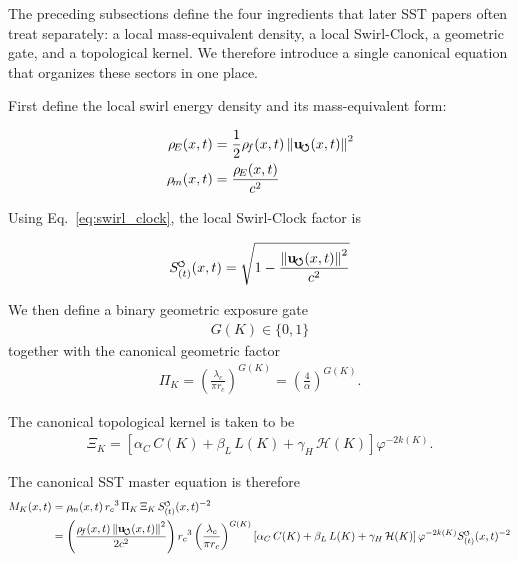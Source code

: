 \documentclass[11pt]{article}
\theoremstyle{definition}
\theoremstyle{plain}
\theoremstyle{remark}
\newcommand{\swirlarrow}{\mathchoice{\mkern-2mu\scriptstyle\boldsymbol{\circlearrowleft}}{\mkern-2mu\scriptstyle\boldsymbol{\circlearrowleft}}{\mkern-2mu\scriptscriptstyle\boldsymbol{\circlearrowleft}}{\mkern-2mu\scriptscriptstyle\boldsymbol{\circlearrowleft}}}
\newcommand{\rhoF}{{\rho_{\!f}}}
\newcommand{\rhoE}{\rho_{\!E}}
\newcommand{\rhoM}{\rho_{\!m}}
\newcommand{\SwirlClock}{{S_{(t)}^{\swirlarrow}}}
\newcommand{\rc}{{r_c}}
\newcommand{\uswirl}{\mathbf{u}_{\!\boldsymbol{\circlearrowleft}}}
\begin{document}
        The preceding subsections define the four ingredients that later SST papers often treat separately:
        a local mass-equivalent density, a local Swirl-Clock, a geometric gate, and a topological kernel.
        We therefore introduce a single canonical equation that organizes these sectors in one place.

        First define the local swirl energy density and its mass-equivalent form:

        \begin{align}
            \rhoE(x,t) &= \frac{1}{2}\rhoF(x,t)\,\norm{\uswirl(x,t)}^2 \\
            \rhoM(x,t) &= \frac{\rhoE(x,t)}{c^2}
        \end{align}

        Using Eq.~\ref{eq:swirl_clock}, the local Swirl-Clock factor is

        \begin{align}
            \SwirlClock(x,t) = \sqrt{1 - \frac{\norm{\uswirl(x,t)}^2}{c^2}}
        \end{align}

        We then define a binary geometric exposure gate
        \begin{align}
            G(K) \in \{0,1\}
        \end{align}
        together with the canonical geometric factor
        \begin{align}
            \Pi_K = \left( \frac{\lambda_c}{\pi \rc} \right)^{G(K)} = \left( \frac{4}{\alpha} \right)^{G(K)} .
        \end{align}

        The canonical topological kernel is taken to be
        \begin{align}
            \Xi_K = \left[ \alpha_C\,C(K) + \beta_L\,L(K) + \gamma_H\,\mathcal{H}(K) \right] \varphi^{-2k(K)} .
        \end{align}

        The canonical SST master equation is therefore
        \begin{align}
            M_K(x,t)
            &= \rhoM(x,t)\,\rc^3\,\Pi_K\,\Xi_K\,\SwirlClock(x,t)^{-2} \\
            &= \left( \frac{\rhoF(x,t)\,\norm{\uswirl(x,t)}^2}{2c^2} \right)
               \rc^3
               \left( \frac{\lambda_c}{\pi \rc} \right)^{G(K)}
               \left[ \alpha_C\,C(K) + \beta_L\,L(K) + \gamma_H\,\mathcal{H}(K) \right]
               \varphi^{-2k(K)}
               \SwirlClock(x,t)^{-2}
            \label{eq:sst_master_equation}
        \end{align}
\end{document}
